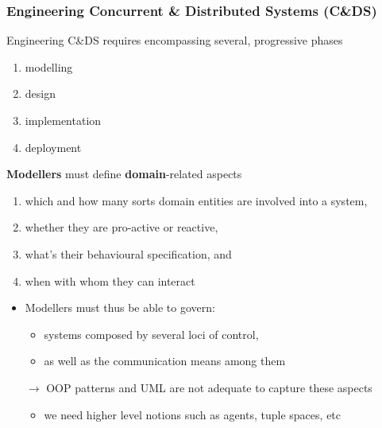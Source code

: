 \documentclass[presentation]{beamer}\mode<presentation>{\usetheme{AMSCesenaPurpleAndGold}}
\begin{document}
\begin{frame}[allowframebreaks]
	\frametitle{Engineering Concurrent \& Distributed Systems (C\&DS)}

	Engineering C\&DS requires encompassing several, progressive phases
	\begin{enumerate}
		\item modelling
		\item design
		\item implementation
		\item deployment
	\end{enumerate}

	\framebreak

	\begin{block}{\textbf{Modellers} must define \textbf{domain}-related aspects}
		\begin{enumerate}
			\item which and how many sorts \alert{domain entities} are involved into a system,
			\item whether they are \alert{pro-active} or \alert{reactive},
			\item what's their \alert{behavioural specification}, and
			\item when with whom they can \alert{interact}
		\end{enumerate}
	\end{block}

	\bigskip

	\begin{itemize}
		\item Modellers must thus be able to govern:
		\begin{itemize}
			\item systems composed by several \alert{loci of control},
			\item as well as the \alert{communication means} among them
		\end{itemize}

		\bigskip

		\item[$\rightarrow$] OOP patterns and UML are not adequate to capture these aspects
		\begin{itemize}
			\item we need higher level notions such as \alert{agents}, \alert{tuple spaces}, etc
		\end{itemize}
	\end{itemize}

	\framebreak


\end{frame}
\end{document}
